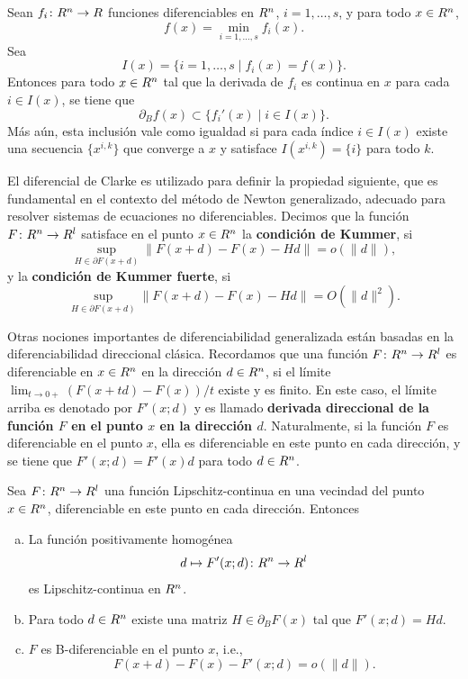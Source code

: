 \begin{theorem}\label{v2:thm:1.6.2}
    Sean $f_i \colon R^n \to R$ funciones diferenciables en $R^n$, $i = 1, \dots, s$, y para todo $x \in R^n$,
    \[
        f(x) = \min_{i=1,\dots,s} f_i(x).
    \]
    Sea
    \[
        I(x) = \{i = 1, \dots, s \mid f_i(x) = f(x)\}.
    \]
    Entonces para todo $x \in R^n$ tal que la derivada de $f_i$ es continua en $x$ para cada $i \in I(x)$, se tiene que
    \[
        \partial_B f(x) \subset \{f_i'(x) \mid i \in I(x)\}.
    \]
    Más aún, esta inclusión vale como igualdad si para cada índice $i \in I(x)$ existe una secuencia $\{x^{i,k}\}$ que converge a $x$ y satisface $I(x^{i,k}) = \{i\}$ para todo $k$.
\end{theorem}

El diferencial de Clarke es utilizado para definir la propiedad siguiente, que es fundamental en el contexto del método de Newton generalizado, adecuado para resolver sistemas de ecuaciones no diferenciables. Decimos que la función $F \colon R^n \to R^l$ satisface en el punto $x \in R^n$ la \textbf{condición de Kummer}, si
\begin{equation}
    \sup_{H \in \partial F(x+d)} \|F(x+d) - F(x) - Hd\| = o(\|d\|),
    \label{v2:eq:1.48}
\end{equation}
y la \textbf{condición de Kummer fuerte}, si
\begin{equation}
    \sup_{H \in \partial F(x+d)} \|F(x+d) - F(x) - Hd\| = O(\|d\|^2).
    \label{v2:eq:1.49}
\end{equation}

Otras nociones importantes de diferenciabilidad generalizada están basadas en la diferenciabilidad direccional clásica. Recordamos que una función $F \colon R^n \to R^l$ es diferenciable en $x \in R^n$ en la dirección $d \in R^n$, si el límite $\lim_{t \to 0+} (F(x+td) - F(x))/t$ existe y es finito. En este caso, el límite arriba es denotado por $F'(x; d)$ y es llamado \textbf{derivada direccional de la función $F$ en el punto $x$ en la dirección $d$}. Naturalmente, si la función $F$ es diferenciable en el punto $x$, ella es diferenciable en este punto en cada dirección, y se tiene que $F'(x; d) = F'(x)d$ para todo $d \in R^n$.

\begin{theorem}\label{v2:thm:1.6.3}
    Sea $F \colon R^n \to R^l$ una función Lipschitz-continua en una vecindad del punto $x \in R^n$, diferenciable en este punto en cada dirección. Entonces
    \begin{enumerate}[(a)]
        \item La función positivamente homogénea
        \[
            d \mapsto F'(x; d) \colon R^n \to R^l
        \]
        es Lipschitz-continua en $R^n$.
        \item Para todo $d \in R^n$ existe una matriz $H \in \partial_B F(x)$ tal que $F'(x; d) = Hd$.
        \item $F$ es B-diferenciable en el punto $x$, i.e.,
        \[
            F(x+d) - F(x) - F'(x; d) = o(\|d\|).
        \]
    \end{enumerate}
\end{theorem}

